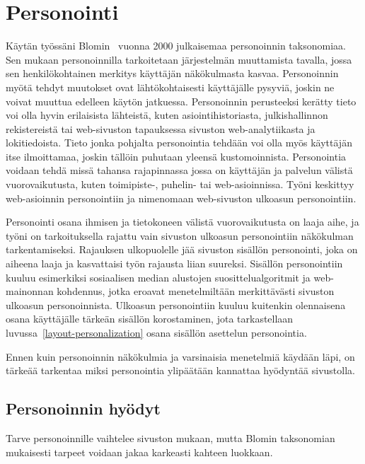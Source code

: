 \documentclass[finnish, 12pt, a4paper, elec, utf8, a-1b, online]{aaltothesis}
\begin{document}
\clearpage

\section{Personointi}\label{personalization}

Käytän työssäni Blomin~\cite{10.1145/633292.633483} vuonna 2000 julkaisemaa
personoinnin taksonomiaa. Sen mukaan personoinnilla tarkoitetaan järjestelmän
muuttamista tavalla, jossa sen henkilökohtainen merkitys käyttäjän näkökulmasta
kasvaa. Personoinnin myötä tehdyt muutokset ovat lähtökohtaisesti käyttäjälle
pysyviä, joskin ne voivat muuttua edelleen käytön jatkuessa. Personoinnin
perusteeksi kerätty tieto voi olla hyvin erilaisista lähteistä, kuten
asiointihistoriasta, julkishallinnon rekistereistä tai web-sivuston tapauksessa
sivuston web-analytiikasta ja lokitiedoista. Tieto jonka pohjalta personointia
tehdään voi olla myös käyttäjän itse ilmoittamaa, joskin tällöin puhutaan
yleensä kustomoinnista. Personointia voidaan tehdä missä tahansa rajapinnassa
jossa on käyttäjän ja palvelun välistä vuorovaikutusta, kuten toimipiste-,
puhelin- tai web-asioinnissa. Työni keskittyy web-asioinnin personointiin ja
nimenomaan web-sivuston ulkoasun personointiin.

Personointi osana ihmisen ja tietokoneen välistä vuorovaikutusta on laaja aihe,
ja työni on tarkoituksella rajattu vain sivuston ulkoasun personointiin
näkökulman tarkentamiseksi. Rajauksen ulkopuolelle jää sivuston sisällön
personointi, joka on aiheena laaja ja kasvattaisi työn rajausta liian suureksi.
Sisällön personointiin kuuluu esimerkiksi sosiaalisen median alustojen
suosittelualgoritmit ja web-mainonnan kohdennus, jotka eroavat menetelmiltään
merkittävästi sivuston ulkoasun personoinnista. Ulkoasun personointiin kuuluu
kuitenkin olennaisena osana käyttäjälle tärkeän sisällön korostaminen, jota
tarkastellaan luvussa~\ref{layout-personalization} osana sisällön asettelun
personointia.

Ennen kuin personoinnin näkökulmia ja varsinaisia menetelmiä käydään läpi, on
tärkeää tarkentaa miksi personointia ylipäätään kannattaa hyödyntää
sivustolla.

\subsection{Personoinnin hyödyt}\label{personalization-pros}

Tarve personoinnille vaihtelee sivuston mukaan, mutta Blomin taksonomian
mukaisesti tarpeet voidaan jakaa karkeasti kahteen luokkaan.
\end{document}
